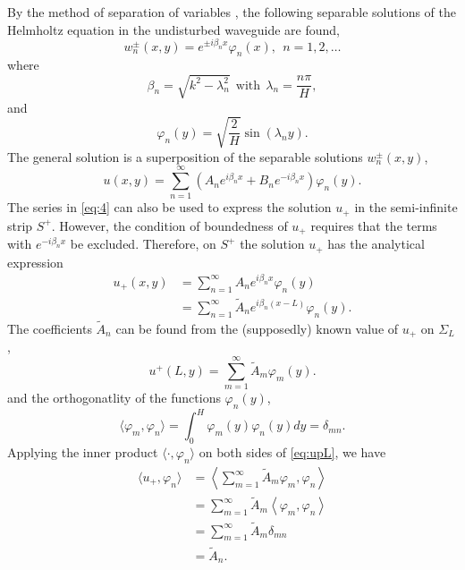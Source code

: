 \documentclass[11pt]{article}
\newcommand{\wt}[1]{\widetilde{#1}}
\begin{document}
By the method of separation of variables \cite{chesnel2025tutorial}, the following separable solutions of the Helmholtz equation in the undisturbed waveguide are found,
\begin{equation}
  \label{eq:1}
  w_n^\pm(x,y) = e^{\pm i \beta_n x} \varphi_n(x),~~n=1,2,\ldots
\end{equation}
where
\begin{equation}
  \label{eq:2}
  \beta_n = \sqrt{k^2 - \lambda_n^2}~~\mathrm{with}~~\lambda_n = \frac{n\pi}{H},
\end{equation}
and
\begin{equation}
  \label{eq:3}
  \varphi_n(y) = \sqrt{\frac{2}{H}}\sin(\lambda_n y).
\end{equation}
The general solution is a superposition of the separable solutions $w_n^\pm(x,y)$,
\begin{equation}
  \label{eq:4}
  u(x,y) = \sum_{n=1}^\infty \left(A_n e^{i \beta_n x} + B_n e^{-i\beta_n x}\right)\varphi_n(y).
\end{equation}
The series in \eqref{eq:4} can also be used to express the solution $u_+$ in the semi-infinite strip $S^+$. However, the condition of boundedness of $u_+$ requires that the terms with $e^{-i\beta_n x}$ be excluded. Therefore, on $S^+$ the solution $u_+$ has the analytical expression
\begin{align}
  \label{eq:5}
  u_+(x,y) &= \sum_{n=1}^\infty A_n e^{i \beta_n x}\varphi_n(y) \\
           &= \sum_{n=1}^\infty \wt{A}_n e^{i \beta_n (x-L)}\varphi_n(y).\label{eq:sum_wtA}
\end{align}
The coefficients $\wt{A}_n$ can be found from the (supposedly) known value of $u_+$ on $\Sigma_L$, 
\begin{equation}
  \label{eq:upL}
  u^+(L,y) = \sum_{m=1}^\infty \wt{A}_m \varphi_m(y).             
\end{equation}
and the orthogonatlity of the functions $\varphi_n(y)$,  
\begin{equation}
  \label{eq:6}
  \langle \varphi_m,\varphi_n \rangle = \int_0^H \varphi_m(y) \varphi_n(y) dy = \delta_{mn}.
\end{equation}
Applying the inner product $\langle \cdot, \varphi_n \rangle$ on both sides of \eqref{eq:upL}, we have
\begin{align}
  \langle u_+, \varphi_n \rangle &= \left\langle \sum_{m=1}^\infty \wt{A}_m \varphi_m , \varphi_n \right\rangle \\
                                 &= \sum_{m=1}^\infty \wt{A}_m \left\langle \varphi_m , \varphi_n \right\rangle \\
                                 &= \sum_{m=1}^\infty \wt{A}_m \delta_{mn} \\                                  
                                 &= \wt{A}_n.\label{eq:wtA}
\end{align}
\end{document}
